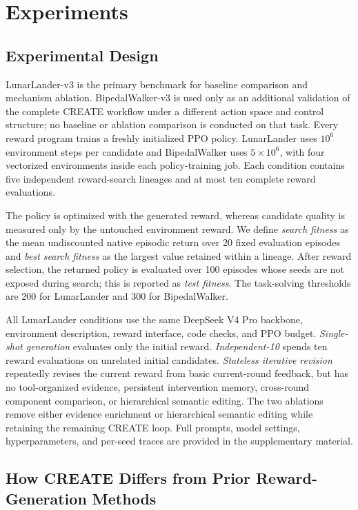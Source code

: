 \section{Experiments}
\label{sec:experiments}

\subsection{Experimental Design}
\label{sec:exp_design}

LunarLander-v3 is the primary benchmark for baseline comparison and mechanism ablation. BipedalWalker-v3 is used only as an additional validation of the complete CREATE workflow under a different action space and control structure; no baseline or ablation comparison is conducted on that task. Every reward program trains a freshly initialized PPO policy. LunarLander uses $10^6$ environment steps per candidate and BipedalWalker uses $5\times10^6$, with four vectorized environments inside each policy-training job. Each condition contains five independent reward-search lineages and at most ten complete reward evaluations.

The policy is optimized with the generated reward, whereas candidate quality is measured only by the untouched environment reward. We define \emph{search fitness} as the mean undiscounted native episodic return over 20 fixed evaluation episodes and \emph{best search fitness} as the largest value retained within a lineage. After reward selection, the returned policy is evaluated over 100 episodes whose seeds are not exposed during search; this is reported as \emph{test fitness}. The task-solving thresholds are 200 for LunarLander and 300 for BipedalWalker.

All LunarLander conditions use the same DeepSeek V4 Pro backbone, environment description, reward interface, code checks, and PPO budget. \emph{Single-shot generation} evaluates only the initial reward. \emph{Independent-10} spends ten reward evaluations on unrelated initial candidates. \emph{Stateless iterative revision} repeatedly revises the current reward from basic current-round feedback, but has no tool-organized evidence, persistent intervention memory, cross-round component comparison, or hierarchical semantic editing. The two ablations remove either evidence enrichment or hierarchical semantic editing while retaining the remaining CREATE loop. Full prompts, model settings, hyperparameters, and per-seed traces are provided in the supplementary material.

\subsection{How CREATE Differs from Prior Reward-Generation Methods}

